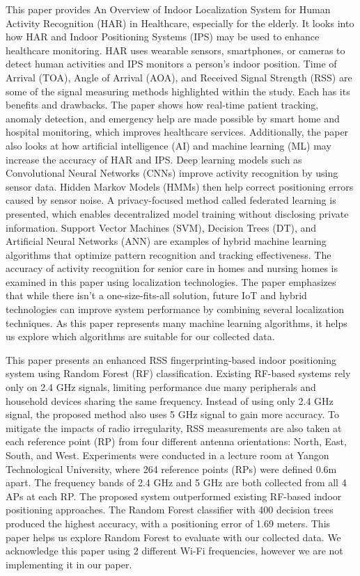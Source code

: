 \documentclass[conference]{IEEEtran}
\begin{document}
	 This paper \cite{LRE4} provides An Overview of Indoor Localization System for Human Activity Recognition (HAR) in Healthcare, especially for the elderly. It looks into how HAR and Indoor Positioning Systems (IPS) may be used to enhance healthcare monitoring. HAR uses wearable sensors, smartphones, or cameras to detect human activities and IPS monitors a person's indoor position. Time of Arrival (TOA), Angle of Arrival (AOA), and Received Signal Strength (RSS) are some of the signal measuring methods highlighted within the study. Each has its benefits and drawbacks. The paper shows how real-time patient tracking, anomaly detection, and emergency help are made possible by smart home and hospital monitoring, which improves healthcare services. Additionally, the paper also looks at how artificial intelligence (AI) and machine learning (ML) may increase the accuracy of HAR and IPS. Deep learning models such as Convolutional Neural Networks (CNNs) improve activity recognition by using sensor data. Hidden Markov Models (HMMs) then help correct positioning errors caused by sensor noise. A privacy-focused method called federated learning is presented, which enables decentralized model training without disclosing private information. Support Vector Machines (SVM), Decision Trees (DT), and Artificial Neural Networks (ANN) are examples of hybrid machine learning algorithms that optimize pattern recognition and tracking effectiveness. The accuracy of activity recognition for senior care in homes and nursing homes is examined in this paper using localization technologies. The paper emphasizes that while there isn't a one-size-fits-all solution, future IoT and hybrid technologies can improve system performance by combining several localization techniques. As this paper represents many machine learning algorithms, it helps us explore which algorithms are suitable for our collected data.
	
	This paper \cite{LRE5} presents an enhanced RSS fingerprinting-based indoor positioning system using Random Forest (RF) classification. Existing RF-based systems rely only on 2.4 GHz signals, limiting performance due many peripherals and household devices sharing the same frequency. Instead of using only 2.4 GHz signal, the proposed method also uses 5 GHz signal to gain more accuracy. To mitigate the impacts of radio irregularity, RSS measurements are also taken at each reference point (RP) from four different antenna orientations: North, East, South, and West. 
	Experiments were conducted in a lecture room at Yangon Technological University, where 264 reference points (RPs) were defined 0.6m apart. The frequency bands of 2.4 GHz and 5 GHz are both collected from all 4 APs at each RP. The proposed system outperformed existing RF-based indoor positioning approaches. The Random Forest classifier with 400 decision trees produced the highest accuracy, with a positioning error of 1.69 meters. This paper helps us explore Random Forest to evaluate with our collected data. We acknowledge this paper using 2 different Wi-Fi frequencies, however we are not implementing it in our paper.
	
\end{document}
